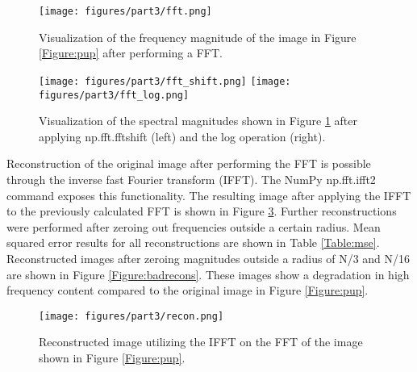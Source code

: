 \documentclass{article}
\begin{document}
\begin{figure}[!ht]
  \centering
  \texttt{[image: figures/part3/fft.png]}
  \caption{Visualization of the frequency magnitude of the image in Figure \ref{Figure:pup} after performing a FFT. }
  \label{Figure:fftpup}
\end{figure}

\begin{figure}[!ht]
  \centering
  \texttt{[image: figures/part3/fft\_shift.png]}
  \texttt{[image: figures/part3/fft\_log.png]}
  \caption{Visualization of the spectral magnitudes shown in Figure \ref{Figure:fftpup} after applying np.fft.fftshift (left) and the log operation (right). }
  \label{Figure:fftbetterpup}
\end{figure}

Reconstruction of the original image after performing the FFT is possible through the inverse fast Fourier transform (IFFT). The NumPy np.fft.ifft2 command exposes this functionality. The resulting image after applying the IFFT to the previously calculated FFT is shown in Figure \ref{Figure:reconpup}. Further reconstructions were performed after zeroing out frequencies outside a certain radius. Mean squared error results for all reconstructions are shown in Table \ref{Table:mse}. Reconstructed images after zeroing magnitudes outside a radius of N/3 and N/16 are shown in Figure \ref{Figure:badrecons}. These images show a degradation in high frequency content compared to the original image in Figure \ref{Figure:pup}.

\begin{figure}[!ht]
  \centering
  \texttt{[image: figures/part3/recon.png]}
  \caption{Reconstructed image utilizing the IFFT on the FFT of the image shown in Figure \ref{Figure:pup}. }
  \label{Figure:reconpup}
\end{figure}

\begin{table}[!ht]
    \centering
    \caption{Mean squared error results for IFFT image reconstruction after altering the frequency magnitude of the image shown in Figure \ref{Figure:pup}.}
    \label{Table:mse}
\end{table}
\end{document}

